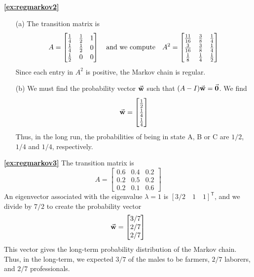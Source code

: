 \textbf{\ref{ex:regmarkov2}}
\begin{enumerate}
\item[(a)] The transition matrix is
\[
  A = \begin{bmatrix}
           \frac{1}{4}  & \frac{1}{2} & 1 \T\B \\
	   \frac{1}{4}  & \frac{1}{2} & 0 \B \\
	   \frac{1}{2}  & 0   & 0 \B
      \end{bmatrix}
  \quad\textrm{and we compute}
  \quad
  A^2 = \begin{bmatrix}
           \frac{11}{16}  & \frac{3}{8} & \frac{1}{4} \T\B \\
	   \frac{3}{16}  & \frac{3}{8} & \frac{1}{4} \B \\
	   \frac{1}{8}  & \frac{1}{4}   & \frac{1}{2} \B
      \end{bmatrix}
\]
Since each entry in $A^2$ is positive, the Markov chain
is regular.
\item[(b)]  We must find the probability
vector $\vec{\textbf{w}}$ such that $(A-I)\vec{\textbf{w}}=\vec{\textbf{0}}$.
We find
\[
   \BW = \begin{bmatrix}
            \frac{1}{2} \T\B \\ \frac{1}{4} \B \\ \frac{1}{4} \B \\
         \end{bmatrix}
\]
Thus, in the long run, the probabilities of being in state A, B or C
are $1/2$, $1/4$ and $1/4$, respectively.
\end{enumerate}

\newpage

\textbf{\ref{ex:regmarkov3}}
The transition matrix is
\begin{equation}
 A = \begin{bmatrix}
        0.6 & 0.4 & 0.2   \\
        0.2 & 0.5 & 0.2   \\
        0.2 & 0.1 & 0.6
     \end{bmatrix}
\end{equation}
An eigenvector associated with the eigenvalue $\lambda=1$
is $[3/2 \quad 1 \quad 1]^{\textsf{T}}$, and we divide by $7/2$ to create
the probability vector
\[
   \vec{\textbf{w}} = \begin{bmatrix} 3/7 \\ 2/7 \\ 2/7 \end{bmatrix}
\]
This vector gives the long-term probability distribution
of the Markov chain.
Thus, in the long-term, we expected $3/7$ of the males to
be farmers, $2/7$ laborers, and $2/7$ professionals.

